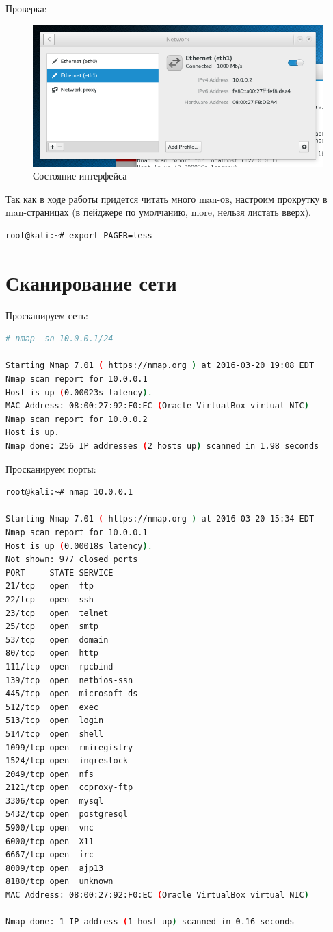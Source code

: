 Проверка:

\begin{figure}[H]
	\includegraphics[width=\textwidth]{nm2.png}
	\caption{Состояние интерфейса}
\end{figure}

Так как в ходе работы придется читать много man-ов, настроим прокрутку в man-страницах (в пейджере по умолчанию, more, нельзя листать вверх).

\begin{lstlisting}[language=bash]
root@kali:~# export PAGER=less
\end{lstlisting}

\section{Сканирование сети}

Просканируем сеть:

\begin{lstlisting}[language=bash]
# nmap -sn 10.0.0.1/24

Starting Nmap 7.01 ( https://nmap.org ) at 2016-03-20 19:08 EDT
Nmap scan report for 10.0.0.1
Host is up (0.00023s latency).
MAC Address: 08:00:27:92:F0:EC (Oracle VirtualBox virtual NIC)
Nmap scan report for 10.0.0.2
Host is up.
Nmap done: 256 IP addresses (2 hosts up) scanned in 1.98 seconds
\end{lstlisting}

Просканируем порты:

\begin{lstlisting}[language=bash]
root@kali:~# nmap 10.0.0.1

Starting Nmap 7.01 ( https://nmap.org ) at 2016-03-20 15:34 EDT
Nmap scan report for 10.0.0.1
Host is up (0.00018s latency).
Not shown: 977 closed ports
PORT     STATE SERVICE
21/tcp   open  ftp
22/tcp   open  ssh
23/tcp   open  telnet
25/tcp   open  smtp
53/tcp   open  domain
80/tcp   open  http
111/tcp  open  rpcbind
139/tcp  open  netbios-ssn
445/tcp  open  microsoft-ds
512/tcp  open  exec
513/tcp  open  login
514/tcp  open  shell
1099/tcp open  rmiregistry
1524/tcp open  ingreslock
2049/tcp open  nfs
2121/tcp open  ccproxy-ftp
3306/tcp open  mysql
5432/tcp open  postgresql
5900/tcp open  vnc
6000/tcp open  X11
6667/tcp open  irc
8009/tcp open  ajp13
8180/tcp open  unknown
MAC Address: 08:00:27:92:F0:EC (Oracle VirtualBox virtual NIC)

Nmap done: 1 IP address (1 host up) scanned in 0.16 seconds
\end{lstlisting}

